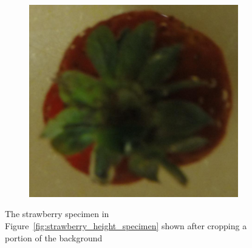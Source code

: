\documentclass {udthesis}
\begin{document}
\begin{figure}
\begin{subfigure}[]{0.12\textwidth}
      \caption{}
  \end{subfigure}
  \begin{subfigure}[]{0.12\textwidth}
      \includegraphics[width=\textwidth]{strawberry4_obj_01/strawberry4_001_08}
      \caption{}
  \end{subfigure}
\caption[Images of a strawberry specimen after cropping a portion of background]{The strawberry specimen in Figure~\ref{fig:strawberry_height_specimen} shown after cropping a portion of the background}
\label{fig:strawberry_height_specimen_cropped}
\end{figure}	
\end{document}
